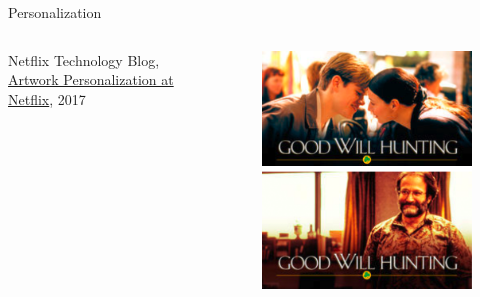 \documentclass[main.tex]{subfiles}
\begin{document}
\begin{frame}{Personalization}
\begin{columns}
\begin{column}{.6\textwidth}
\begin{justify}
                    Netflix Technology Blog, \href{https://medium.com/netflix-techblog/artwork-personalization-c589f074ad76}{Artwork Personalization at Netflix}, 2017
                \end{justify}
            \end{column}
            \begin{column}{.4\textwidth}
                \begin{figure}
                    \label{fig:netflix-personalization}
                    \includegraphics[width=\textwidth]{figures/external/netflix-personalization.png}
                \end{figure}
            \end{column}
        \end{columns}
    \end{frame}
    
\end{document}
